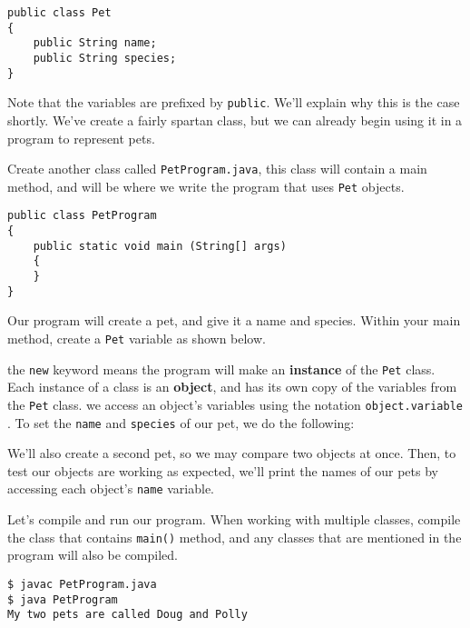 			\begin{lstlisting}[style=Java]
public class Pet
{
	public String name;
	public String species;
}
			\end{lstlisting}
	
			Note that the variables are prefixed by \texttt{public}. We'll explain why this is the case shortly. We've create a fairly spartan class, but we can already begin using it in a program to represent pets.
			
			Create another class called \texttt{PetProgram.java}, this class will contain a main method, and will be where we write the program that uses \texttt{Pet} objects.
			
			\begin{lstlisting}[style=Java]
public class PetProgram
{
	public static void main (String[] args)
	{
	}
}
			\end{lstlisting}
		
			Our program will create a pet, and give it a name and species. Within your main method, create a \texttt{Pet} variable as shown below.
			
			
			
			the \texttt{new} keyword means the program will make an \textbf{instance} of the \texttt{Pet} class. Each instance of a class is an \textbf{object}, and has its own copy of the variables from the \texttt{Pet} class.
			we access an object's variables using the notation \texttt{object.variable }. To set the \texttt{name} and \texttt{species} of our pet, we do the following:
			
			
			
			We'll also create a second pet, so we may compare two objects at once. Then, to test our objects are working as expected, we'll print the names of our pets by accessing each object's \texttt{name} variable.
			
			
			
			Let's compile and run our program. When working with multiple classes, compile the class that contains \texttt{main()} method, and any classes that are mentioned in the program will also be compiled.
			\begin{lstlisting}[style=Terminal]
$ javac PetProgram.java
$ java PetProgram
My two pets are called Doug and Polly
			\end{lstlisting}
	
